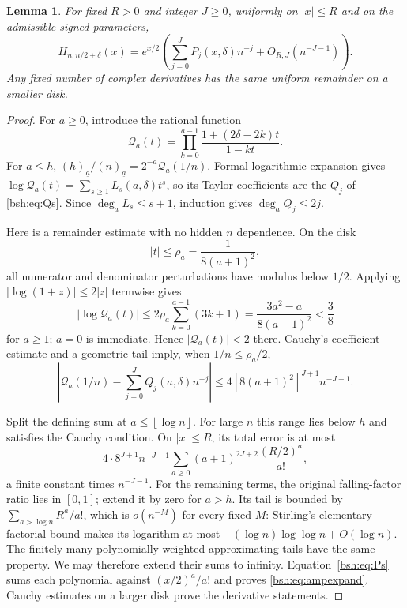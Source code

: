 \documentclass[11pt,letterpaper]{article}
\newtheorem{lemma}[theorem]{Lemma}
\theoremstyle{remark}\newtheorem{remark}[theorem]{Remark}
\newcommand{\fall}[2]{(#1)_{\underline{#2}}}
\newcommand{\floor}[1]{\left\lfloor #1\right\rfloor}
\begin{document}
\begin{lemma}\label{bsh:lem:amplitude}
For fixed $R>0$ and integer $J\geq0$, uniformly on $|x|\leq R$ and on the admissible signed parameters,
\begin{equation}\label{bsh:eq:ampexpand}
 H_{n,n/2+\delta}(x)=e^{x/2}
 \left(\sum_{j=0}^J P_j(x,\delta)n^{-j}+O_{R,J}(n^{-J-1})\right).
\end{equation}
Any fixed number of complex derivatives has the same uniform remainder on a smaller disk.
\end{lemma}
\begin{proof}
For $a\geq0$, introduce the rational function
\[
 \mathcal Q_a(t)=\prod_{k=0}^{a-1}
      \frac{1+(2\delta-2k)t}{1-kt}.
\]
For $a\leq h$, $\fall h a/\fall n a=2^{-a}\mathcal Q_a(1/n)$. Formal logarithmic expansion gives $\log\mathcal Q_a(t)=\sum_{s\geq1}L_s(a,\delta)t^s$, so its Taylor coefficients are the $Q_j$ of \eqref{bsh:eq:Qs}. Since $\deg_aL_s\leq s+1$, induction gives $\deg_aQ_j\leq2j$.

Here is a remainder estimate with no hidden $n$ dependence. On the disk
\[
 |t|\leq\rho_a=\frac1{8(a+1)^2},
\]
all numerator and denominator perturbations have modulus below $1/2$. Applying $|\log(1+z)|\leq2|z|$ termwise gives
\[
 |\log\mathcal Q_a(t)|
 \leq2\rho_a\sum_{k=0}^{a-1}(3k+1)
 =\frac{3a^2-a}{8(a+1)^2}<\frac38
\]
for $a\geq1$; $a=0$ is immediate. Hence $|\mathcal Q_a(t)|<2$ there. Cauchy's coefficient estimate and a geometric tail imply, when $1/n\leq\rho_a/2$,
\begin{equation}\label{bsh:eq:Qremainder}
 \left|\mathcal Q_a(1/n)-\sum_{j=0}^JQ_j(a,\delta)n^{-j}\right|
 \leq4[8(a+1)^2]^{J+1}n^{-J-1}.
\end{equation}

Split the defining sum at $a\leq\floor{\log n}$. For large $n$ this range lies below $h$ and satisfies the Cauchy condition. On $|x|\leq R$, its total error is at most
\[
 4\cdot8^{J+1}n^{-J-1}
 \sum_{a\geq0}(a+1)^{2J+2}\frac{(R/2)^a}{a!},
\]
a finite constant times $n^{-J-1}$. For the remaining terms, the original falling-factor ratio lies in $[0,1]$; extend it by zero for $a>h$. Its tail is bounded by $\sum_{a>\log n}R^a/a!$, which is $o(n^{-M})$ for every fixed $M$: Stirling's elementary factorial bound makes its logarithm at most $-(\log n)\log\log n+O(\log n)$. The finitely many polynomially weighted approximating tails have the same property. We may therefore extend their sums to infinity. Equation~\eqref{bsh:eq:Ps} sums each polynomial against $(x/2)^a/a!$ and proves \eqref{bsh:eq:ampexpand}. Cauchy estimates on a larger disk prove the derivative statements.
\end{proof}
\end{document}
